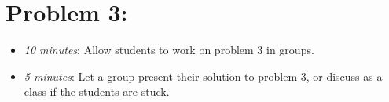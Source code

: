 \documentclass[handout,nooutcomes]{ximera}
\begin{document}
	
	
\section*{Problem 3:}

	\begin{itemize}
	
	\item  \emph{10 minutes}:  Allow students to work on problem 3 in groups.
	
	\item  \emph{5 minutes}:  Let a group present their solution to problem 3, or discuss as a class if the students are stuck.
	
	\end{itemize}
	
	
	

	
	
	
\end{document}
